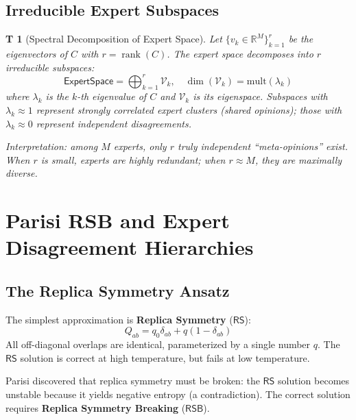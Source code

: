 \documentclass[12pt,a4paper]{article}
\newtheorem{theorem}Theorem[section]
\newcommand{\R}{\mathbb{R}}
\newcommand{\rank}{\operatorname{rank}}
\newcommand{\RS}{\mathsf{RS}}
\newcommand{\RSB}{\mathsf{RSB}}
\begin{document}
\subsection{Irreducible Expert Subspaces}
\begin{theorem}[Spectral Decomposition of Expert Space]\label{thm:irreducible}
Let \(\{v_k \in \R^M\}_{k=1}^{r}\) be the eigenvectors of \(C\) with \(r = \rank(C)\). The expert space decomposes into \(r\) irreducible subspaces:
\begin{equation}\label{eq:irreducible_dec}
\mathsf{ExpertSpace} = \bigoplus_{k=1}^{r} \mathcal{V}_k, \quad \dim(\mathcal{V}_k) = \text{mult}(\lambda_k)
\end{equation}
where \(\lambda_k\) is the \(k\)-th eigenvalue of \(C\) and \(\mathcal{V}_k\) is its eigenspace. Subspaces with \(\lambda_k \approx 1\) represent strongly correlated expert clusters (shared opinions); those with \(\lambda_k \approx 0\) represent independent disagreements.

Interpretation: among \(M\) experts, only \(r\) truly independent ``meta-opinions'' exist. When \(r\) is small, experts are highly redundant; when \(r \approx M\), they are maximally diverse.
\end{theorem}
\section{Parisi RSB and Expert Disagreement Hierarchies}
\subsection{The Replica Symmetry Ansatz}
The simplest approximation is \textbf{Replica Symmetry} (\(\RS\)):
\begin{equation}\label{eq:rs_ansatz}
Q_{ab} = q_0 \delta_{ab} + q (1 - \delta_{ab})
\end{equation}
All off-diagonal overlaps are identical, parameterized by a single number \(q\). The \(\RS\) solution is correct at high temperature, but fails at low temperature.

Parisi discovered that replica symmetry must be broken: the \(\RS\) solution becomes unstable because it yields negative entropy (a contradiction). The correct solution requires \textbf{Replica Symmetry Breaking} (\(\RSB\)).
\end{document}
